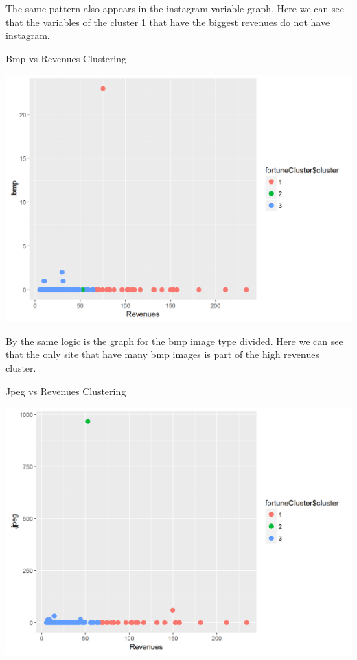 \documentclass{book}
\begin{document}
The same pattern also appears in the instagram variable graph. Here we can see that the variables of the cluster 1 that have the biggest revenues do not have instagram.
\begin{table}[H]
\centering
\caption{Bmp vs Revenues Clustering}
\begin{center}
\includegraphics[scale=0.5]{../R/photos/94_clust_bmp.png}   \\
\end{center}
\end{table}
By the same logic is the graph for the bmp image type divided. Here we can see that the only site that have many bmp images is part of the high revenues cluster.
\begin{table}[H]
\centering
\caption{Jpeg vs Revenues Clustering}
\begin{center}
\includegraphics[scale=0.5]{../R/photos/95_clust_jpe.png}   \\
\end{center}
\end{table}
\end{document}

